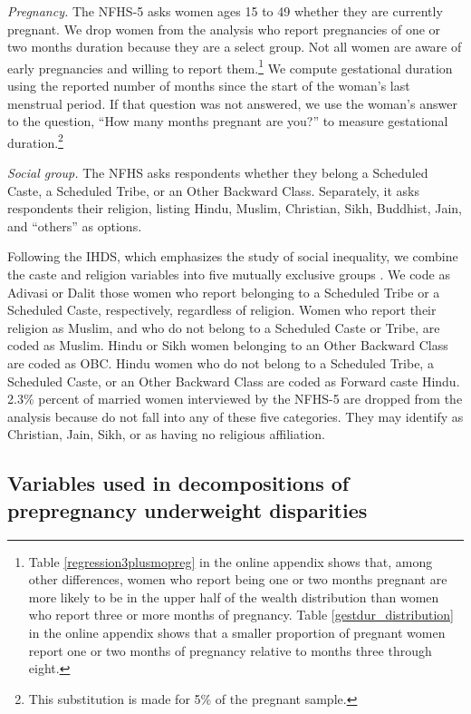\documentclass[12pt]{article}
\begin{document}
\textit{Pregnancy.} The NFHS-5 asks women ages 15 to 49 whether they are currently pregnant.  We drop women from the analysis who report pregnancies of one or two months duration because they are a select group.  Not all women are aware of early pregnancies and willing to report them.\footnote{Table \ref{regression3plusmopreg} in the online appendix shows that, among other differences, women who report being one or two months pregnant are more likely to be in the upper half of the wealth distribution than women who report three or more months of pregnancy. Table \ref{gestdur_distribution} in the online appendix shows that a smaller proportion of pregnant women report one or two months of pregnancy relative to months three through eight.}  We compute gestational duration using the reported number of months since the start of the woman's last menstrual period.  If that question was not answered, we use the woman's answer to the question, ``How many months pregnant are you?'' to measure gestational duration.\footnote{This substitution is made for 5\% of the pregnant sample.}  
 
\textit{Social group.}
The NFHS asks respondents whether they belong a Scheduled Caste, a Scheduled Tribe, or an Other Backward Class.  Separately, it asks respondents their religion, listing Hindu, Muslim, Christian, Sikh, Buddhist, Jain, and ``others'' as options. 

Following the IHDS, which emphasizes the study of social inequality, we combine the caste and religion variables into five mutually exclusive groups \citep{IHDS2005}.  We code as Adivasi or Dalit those women who report belonging to a Scheduled Tribe or a Scheduled Caste, respectively, regardless of religion.  Women who report their religion as Muslim, and who do not belong to a Scheduled Caste or Tribe, are coded as Muslim. Hindu or Sikh women belonging to an Other Backward Class are coded as OBC.  Hindu women who do not belong to a Scheduled Tribe, a Scheduled Caste, or an Other Backward Class are coded as Forward caste Hindu.  2.3\% percent of married women interviewed by the NFHS-5 are dropped from the analysis because do not fall into any of these five categories.  They may identify as Christian, Jain, Sikh, or as having no religious affiliation.   

\subsection{Variables used in decompositions of prepregnancy underweight disparities}
\end{document}
